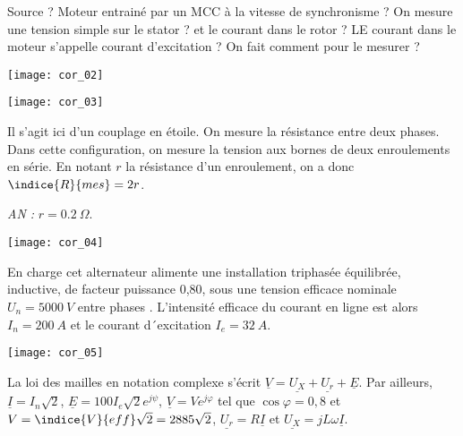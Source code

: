 \ifprof
\begin{corrige}
Source ? Moteur entrainé par un MCC à la vitesse de synchronisme ? On mesure une tension simple sur le stator ? et le courant dans le rotor ? LE courant dans le moteur s'appelle courant d'excitation ? On fait comment pour le mesurer ?

\end{corrige}
\else
\fi

\ifprof
\begin{marginfigure}
\texttt{[image: cor\_02]}
\end{marginfigure}

\begin{marginfigure}
\texttt{[image: cor\_03]}
\end{marginfigure}

\begin{corrige}
Il s'agit ici d'un couplage en étoile. On mesure la résistance entre deux phases. Dans cette configuration, on mesure la tension aux bornes de deux enroulements en série. En notant $r$ la résistance d'un enroulement, on a donc $\indice{R}{mes}=2r$.

\textit{AN :} $r = \SI{0,2}{\Omega}$.

\end{corrige}
\else
\fi



\ifprof
\begin{corrige}
\begin{center}
\texttt{[image: cor\_04]}
\end{center}
\end{corrige}
\else
\fi



En charge cet alternateur alimente une installation triphasée équilibrée, inductive, de facteur puissance 0,80, sous une tension efficace nominale $U_n = \SI{5000}{V}$ entre phases . 
L’intensité efficace du courant en ligne est alors $I_n = \SI{200}{A}$ et le courant d´excitation $I_e = \SI{32}{A}$.


\ifprof
\begin{marginfigure}
\texttt{[image: cor\_05]}
\end{marginfigure}
\begin{corrige}
La loi des mailles en notation complexe s'écrit 
$\underline{V} = \underline{U_X} + \underline{U_r} + \underline{E}$. 
Par ailleurs, 
$\underline{I} = I_n \sqrt{2}$, 
$\underline{E} = 100I_e \sqrt{2}e^{j\psi}$, 
$\underline{V} = Ve^{j\varphi}$ tel que $\cos\varphi = 0,8$ et $V = \indice{V}{eff} \sqrt{2}= 2885 \sqrt{2}$, 
$\underline{U_r} = R\underline{I} $ et 
$\underline{U_X} = j L \omega \underline{I}$.
\end{corrige}
\else
\fi

